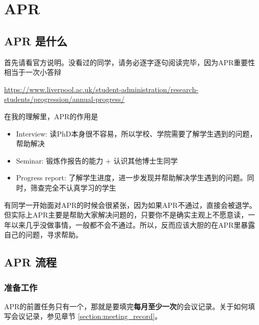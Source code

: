 \section{APR}
\subsection{APR 是什么}
首先请看官方说明。没看过的同学，请务必逐字逐句阅读完毕，因为APR重要性相当于一次小答辩 

\url{https://www.liverpool.ac.uk/student-administration/research-students/progression/annual-progress/}

在我的理解里，APR的作用是
\begin{itemize}
    \item Interview: 读PhD本身很不容易，所以学校、学院需要了解学生遇到的问题，帮助解决
    \item Seminar: 锻炼作报告的能力 + 认识其他博士生同学
    \item Progress report: 了解学生进度，进一步发现并帮助解决学生遇到的问题。同时，筛查完全不认真学习的学生
\end{itemize}

有同学一开始面对APR的时候会很紧张，因为如果APR不通过，直接会被退学。但实际上APR主要是帮助大家解决问题的，只要你不是确实主观上不愿意读，一年以来几乎没做事情，一般都不会不通过。所以，反而应该大胆的在APR里暴露自己的问题，寻求帮助。

\subsection{APR 流程}
\subsubsection{准备工作}
APR的前置任务只有一个，那就是要填完\textbf{每月至少一次}的会议记录。关于如何填写会议记录，参见章节 \ref{section:meeting_record}。

